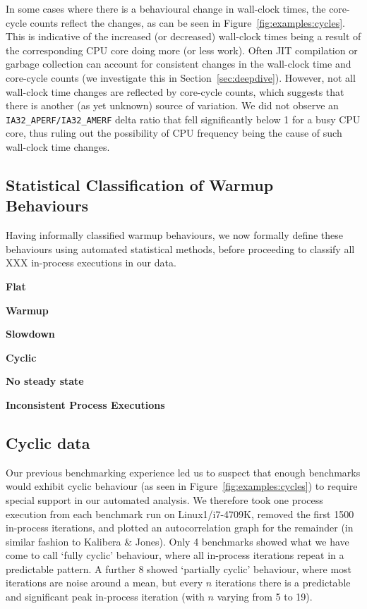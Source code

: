 \documentclass[preprint,numbers,10pt]{sigplanconf}
\newcommand{\kalibera}{Kalibera \& Jones\xspace}
\newcommand{\bencherthree}{Linux1/i7-4709K\xspace}
\begin{document}
In some cases where there is a behavioural change in wall-clock times, the
core-cycle counts reflect the changes, as can be seen in
Figure~\ref{fig:examples:cycles}. This is indicative of the increased (or
decreased) wall-clock times being a result of the corresponding CPU core doing
more (or less work). Often JIT compilation or garbage collection can account
for consistent changes in the wall-clock time and core-cycle counts (we
investigate this in Section~\ref{sec:deepdive}). However, not all wall-clock
time changes are reflected by core-cycle counts, which suggests that there is
another (as yet unknown) source of variation. We did not observe an
\texttt{IA32\_APERF/IA32\_AMERF} delta ratio that fell significantly below 1
for a busy CPU core, thus ruling out the possibility of CPU frequency being the
cause of such wall-clock time changes.

\subsection{Statistical Classification of Warmup Behaviours}
\label{sec:stats}

Having informally classified warmup behaviours, we now formally define these
behaviours using automated statistical methods, before proceeding to classify
all XXX in-process executions in our data.


\textbf{Flat}

\textbf{Warmup}

\textbf{Slowdown}

\textbf{Cyclic}

\textbf{No steady state}

\textbf{Inconsistent Process Executions}



\subsection{Cyclic data}

Our previous benchmarking experience led us to suspect that enough benchmarks
would exhibit cyclic behaviour (as seen in Figure~\ref{fig:examples:cycles}) to
require special support in our automated analysis. We therefore took one process
execution from each benchmark run on \bencherthree, removed the first 1500
in-process iterations, and plotted an autocorrelation graph for the remainder
(in similar fashion to \kalibera). Only 4 benchmarks showed what we have come to
call `fully cyclic' behaviour, where all in-process iterations repeat in a
predictable pattern. A further 8 showed `partially cyclic' behaviour, where
most iterations are noise around a mean, but every $n$ iterations there is a
predictable and significant peak in-process iteration (with $n$ varying from 5
to 19).
\end{document}
